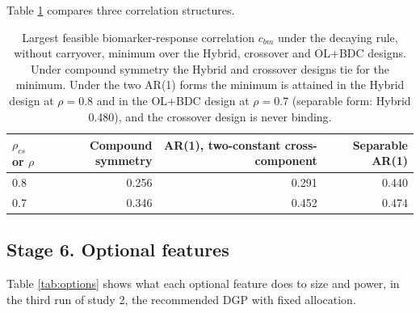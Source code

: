 \documentclass[
  11pt,
]{article}
\begin{document}
Table \ref{tab:ceilings} compares three correlation structures.

\begin{table}

\caption{\label{tab:ceilings}Largest feasible biomarker-response correlation $c_{bm}$ under the decaying rule, without carryover, minimum over the Hybrid, crossover and OL+BDC designs. Under compound symmetry the Hybrid and crossover designs tie for the minimum. Under the two AR(1) forms the minimum is attained in the Hybrid design at $\rho = 0.8$ and in the OL+BDC design at $\rho = 0.7$ (separable form: Hybrid 0.480), and the crossover design is never binding.}
\centering
\begin{tabular}[t]{lrrr}
\toprule
$\rho_{cs}$ or $\rho$ & Compound symmetry & AR(1), two-constant cross-component & Separable AR(1)\\
\midrule
0.8 & 0.256 & 0.291 & 0.440\\
0.7 & 0.346 & 0.452 & 0.474\\
\bottomrule
\end{tabular}
\end{table}

\subsection{Stage 6. Optional features}\label{stage-6.-optional-features}

Table \ref{tab:options} shows what each optional feature does to size
and power, in the third run of study 2, the recommended DGP with fixed
allocation.
\end{document}
